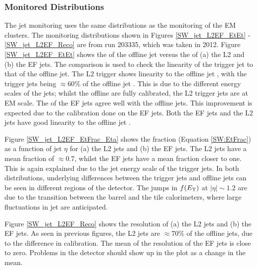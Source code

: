 \subsubsection{Monitored Distributions}

The jet monitoring uses the same distributions as the monitoring of the EM clusters.
The monitoring distributions shown in Figures \ref{SW_jet_L2EF_EtEt} - \ref{SW_jet_L2EF_Reco} are from run 203335, which was taken in 2012.
Figure \ref{SW_jet_L2EF_EtEt} shows the \et{} of the offline jet versus the \et{} of (a) the L2 and (b) the EF jets.
The \et{} comparison is used to check the linearity of the trigger jet \et{} to that of the offline jet.
The L2 trigger \et{} shows linearity to the offline jet \et{}, with the trigger jets \et{} being $\approx 60 \%$ of the offline jet \et{}. 
This is due to the different energy scales of the jets; whilst the offline are fully calibrated, the L2 trigger jets are at EM scale.
The \et{} of the EF jets agree well with the offline jets. 
This improvement is expected due to the calibration done on the EF jets.
Both the EF jets and the L2 jets have good linearity to the offline jet \et{}.

Figure \ref{SW_jet_L2EF_EtFrac_Eta} shows the \et{} fraction (Equation \ref{SW:EtFrac}) as a function of jet $\eta$ for (a) the L2 jets and (b) the EF jets.
The L2 jets have a mean \et{} fraction of $\approx 0.7$, whilst the EF jets have a mean \et{} fraction closer to one.  
This is again explained due to the jet energy scale of the trigger jets.
In both distributions, underlying differences between the trigger jets and offline jets can be seen in different regions of the detector.
The jumps in $f(\mbox{$E_{\rm T}$}{})$ at $|\eta|\sim1.2$ are due to the transition between the barrel and the tile calorimeters, where large fluctuations in jet \pt{} are anticipated.


Figure \ref{SW_jet_L2EF_Reco} shows the \et{} resolution of (a) the L2 jets and (b) the EF jets. 
As seen in previous figures, the L2 jets are $\approx 70 \%$ of the offline jets, due to the difference in calibration.
The mean of the \et{} resolution of the EF jets is close to zero. 
Problems in the detector should show up in the plot as a change in the mean.



